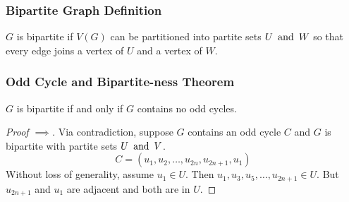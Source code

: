 \subsubsection*{Bipartite Graph Definition}
$G$ is bipartite if $V(G)$ can be partitioned into partite sets $U \operatorname{~\text{and}~} W$ so that every edge joins a vertex of $U$ and a vertex of $W$.

\subsubsection*{Odd Cycle and Bipartite-ness Theorem}
$G$ is bipartite if and only if $G$ contains no odd cycles.
\begin{proof}[Proof $\implies$]
    Via contradiction, suppose $G$ contains an odd cycle $C$ and $G$ is bipartite with partite sets $U \operatorname{~\text{and}~} V$.
    \[
        C = (u_1,u_2,\ldots,u_{2n},u_{2n+1},u_1)
    \]
    Without loss of generality, assume $u_1 \in U$. Then $u_1,u_3,u_5,\ldots,u_{2n+1} \in U$. But $u_{2n+1}$ and $u_1$ are adjacent and both are in $U$.
\end{proof}
